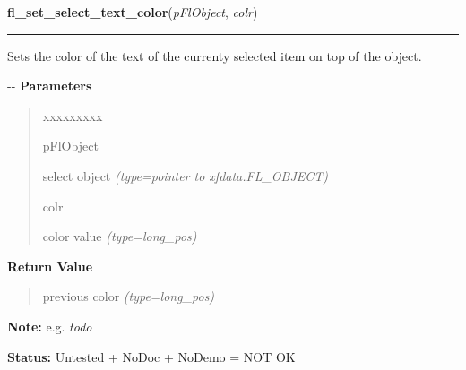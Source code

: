 \hspace{.8\funcindent}\begin{boxedminipage}{\funcwidth}

    \raggedright \textbf{fl\_set\_select\_text\_color}(\textit{pFlObject}, \textit{colr})

    \vspace{-1.5ex}

    \rule{\textwidth}{0.5\fboxrule}
\setlength{\parskip}{2ex}

Sets the color of the text of the currenty selected item on top of
the object.

-{}-
\setlength{\parskip}{1ex}
      \textbf{Parameters}
      \vspace{-1ex}

      \begin{quote}
        \begin{Ventry}{xxxxxxxxx}

          \item[pFlObject]


select object
            {\it (type=pointer to xfdata.FL\_OBJECT)}

          \item[colr]


color value
            {\it (type=long\_pos)}

        \end{Ventry}

      \end{quote}

      \textbf{Return Value}
    \vspace{-1ex}

      \begin{quote}

previous color
      {\it (type=long\_pos)}

      \end{quote}

\textbf{Note:} 
e.g. \emph{todo}


\textbf{Status:} 
Untested + NoDoc + NoDemo = NOT OK


    \end{boxedminipage}

    \label{xformslib:flselect:fl_get_select_text_font}

    \vspace{0.5ex}

